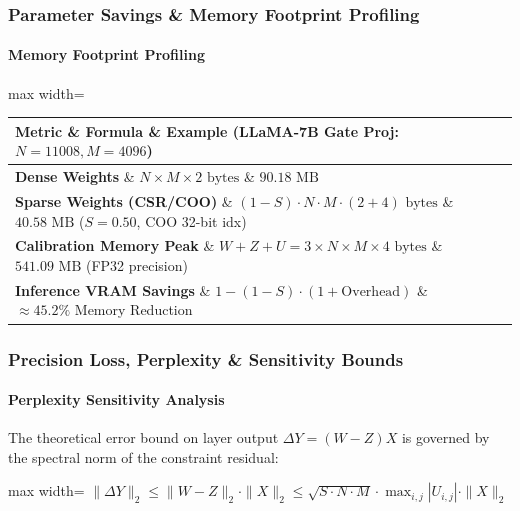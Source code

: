 \subsubsection*{Parameter Savings \& Memory Footprint Profiling}

\paragraph{Memory Footprint Profiling}

\begin{center}
\begin{adjustbox}{max width=\columnwidth}
\renewcommand{\arraystretch}{1.2}
\begin{tabular}{lll}
\toprule
Metric \& Formula \& Example (LLaMA-7B Gate Proj: $N=11008, M=4096$) \\
\midrule
\textbf{Dense Weights} \& $N \times M \times 2 \text{ bytes}$ \& $90.18 \text{ MB}$ \\
\textbf{Sparse Weights (CSR/COO)} \& $(1 - S) \cdot N \cdot M \cdot (2 + 4) \text{ bytes}$ \& $40.58 \text{ MB}$ ($S=0.50$, COO 32-bit idx) \\
\textbf{Calibration Memory Peak} \& $W + Z + U = 3 \times N \times M \times 4 \text{ bytes}$ \& $541.09 \text{ MB}$ (FP32 precision) \\
\textbf{Inference VRAM Savings} \& $1 - (1 - S) \cdot (1 + \text{Overhead})$ \& $\approx 45.2\%$ Memory Reduction \\

\bottomrule
\end{tabular}
\end{adjustbox}
\end{center}

\subsubsection*{Precision Loss, Perplexity \& Sensitivity Bounds}

\paragraph{Perplexity Sensitivity Analysis}

The theoretical error bound on layer output $\Delta Y = (W - Z) X$ is governed by the spectral norm of the constraint residual:

\begin{center}
\begin{adjustbox}{max width=\columnwidth}
$\displaystyle
\| \Delta Y \|_2 \le \| W - Z \|_2 \cdot \| X \|_2 \le \sqrt{S \cdot N \cdot M} \cdot \max_{i,j} |U_{i,j}| \cdot \| X \|_2
$
\end{adjustbox}
\end{center}


